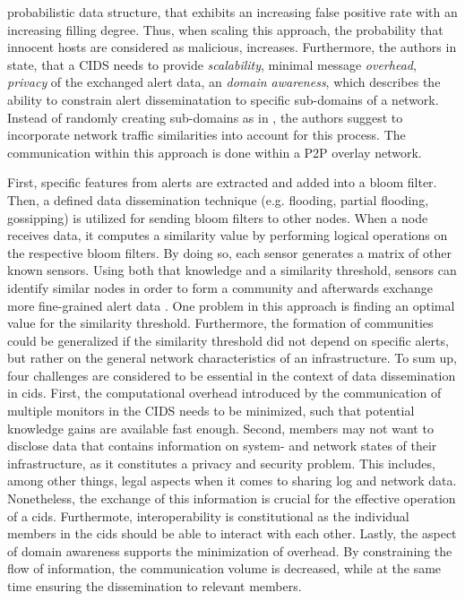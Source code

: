 \documentclass[../../main.tex]{subfiles}
\begin{document}
probabilistic data structure, that exhibits an increasing false positive rate with an increasing filling degree. Thus, when scaling this approach, the probability that innocent hosts are considered as malicious, increases. Furthermore, the authors in \cite{Vasilomanolakis2015SkipMon} state, that a CIDS needs to provide \textit{scalability}, minimal message \textit{overhead}, \textit{privacy} of the exchanged alert data, an \textit{domain awareness}, which describes the ability to constrain alert disseminatation to specific sub-domains of a network. Instead of randomly creating sub-domains as in \cite{Locasto2005}, the authors suggest to incorporate network traffic similarities into account for this process. The communication within this approach is done within a P2P overlay network. 

First, specific features from alerts are extracted and added into a bloom filter. Then, a defined data dissemination technique (e.g. flooding, partial flooding, gossipping) is utilized for sending bloom filters to other nodes. When a node receives data, it computes a similarity value by performing logical operations on the respective bloom filters. By doing so, each sensor generates a matrix of other known sensors. Using both that knowledge and a similarity threshold, sensors can identify similar nodes in order to form a community and afterwards exchange more fine-grained alert data \cite{vasilomanolakis_collaborative_2016}. One problem in this approach is finding an optimal value for the similarity threshold. Furthermore, the formation of communities could be generalized if the similarity threshold did not depend on specific alerts, but rather on the general network characteristics of an infrastructure. To sum up, four challenges are considered to be essential in the context of data dissemination in \gls{cids}. First, the computational overhead introduced by the communication of multiple monitors in the CIDS needs to be minimized, such that potential knowledge gains are available fast enough. Second, members may not want to disclose data that contains information on system- and network states of their infrastructure, as it constitutes a privacy and security problem. This includes, among other things, legal aspects when it comes to sharing log and network data. Nonetheless, the exchange of this information is crucial for the effective operation of a \gls{cids}. Furthermote, interoperability is constitutional as the individual members in the \gls{cids} should be able to interact with each other. Lastly, the aspect of domain awareness supports the minimization of overhead. By constraining the
flow of information, the communication volume is decreased, while at the same time
ensuring the dissemination to relevant members.
\end{document}

